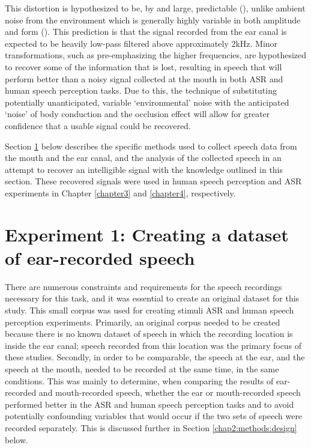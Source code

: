This distortion is hypothesized to be, by and large, predictable (\cite{hansen:97b,reinfeldt:10}), unlike ambient noise from the environment which is generally highly variable in both amplitude and form (\cite{zhang:17}). This prediction is that the signal recorded from the ear canal is expected to be heavily low-pass filtered above approximately 2kHz.  Minor transformations, such as pre-emphasizing the higher frequencies, are hypothesized to recover some of the information that is lost, resulting in speech that will perform better than a noisy signal collected at the mouth in both ASR and human speech perception tasks.
Due to this, the technique of substituting potentially unanticipated, variable `environmental' noise with the anticipated `noise' of body conduction and the occlusion effect will allow for greater confidence that a usable signal could be recovered.    

Section \ref{expt1} below describes the specific methods used to collect speech data from the mouth and the ear canal, and the analysis of the collected speech in an attempt to recover an intelligible signal with the knowledge outlined in this section.  These recovered signals were used in human speech perception and ASR experiments in Chapter \ref{chapter3} and \ref{chapter4}, respectively.


\section{Experiment 1: Creating a dataset of ear-recorded speech}\label{expt1}

There are numerous constraints and requirements for the speech recordings necessary for this task, and it was essential to create an original dataset for this study.  This small corpus was used for creating stimuli ASR and human speech perception experiments.  Primarily, an original corpus needed to be created because there is no known dataset of speech in which the recording location is inside the ear canal; speech recorded from this location was the primary focus of these studies.  Secondly, in order to be comparable, the speech at the ear, and the speech at the mouth, needed to be recorded at the same time, in the same conditions.  This was mainly to determine, when comparing the results of ear-recorded and mouth-recorded speech, whether the ear or mouth-recorded speech performed better in the ASR and human speech perception tasks and to avoid potentially confounding variables that would occur if the two sets of speech were recorded separately. This is discussed further in Section \ref{chap2:methods:design} below.

